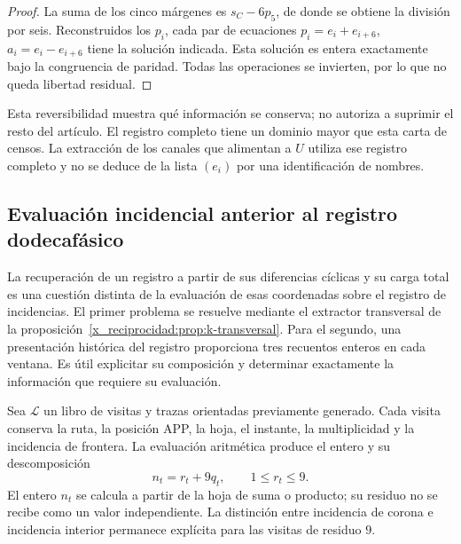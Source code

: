 \begin{proof}
La suma de los cinco márgenes es \(s_C-6p_5\), de donde se obtiene la
división por seis. Reconstruidos los \(p_i\), cada par de ecuaciones
\(p_i=e_i+e_{i+6}\), \(a_i=e_i-e_{i+6}\) tiene la solución indicada.
Esta solución es entera exactamente bajo la congruencia de paridad. Todas
las operaciones se invierten, por lo que no queda libertad residual.
\end{proof}

Esta reversibilidad muestra qué información se conserva; no autoriza a
suprimir el resto del artículo. El registro completo tiene un dominio mayor
que esta carta de censos. La extracción de los canales que alimentan a
\(U\) utiliza ese registro completo y no se deduce de la lista
\((e_i)\) por una identificación de nombres.


\subsection{Evaluación incidencial anterior al registro dodecafásico}
\label{x_reciprocidad:subsec:registro-evaluacion-incidencial}

La recuperación de un registro a partir de sus diferencias cíclicas y su
carga total es una cuestión distinta de la evaluación de esas coordenadas
sobre el registro de incidencias. El primer problema se resuelve mediante el
extractor transversal de la proposición~\ref{x_reciprocidad:prop:k-transversal}.
Para el segundo, una presentación histórica del
registro proporciona tres recuentos enteros en cada ventana. Es útil
explicitar su composición y determinar exactamente la información que
requiere su evaluación.

Sea \(\mathscr L\) un libro de visitas y trazas orientadas previamente
generado. Cada visita conserva la ruta, la posición APP, la hoja, el
instante, la multiplicidad y la incidencia de frontera. La evaluación
aritmética produce el entero y su descomposición
\[
 n_t=r_t+9q_t,\qquad 1\leq r_t\leq9.
\]
El entero \(n_t\) se calcula a partir de la hoja de suma o producto; su
residuo no se recibe como un valor independiente. La distinción entre
incidencia de corona e incidencia interior permanece explícita para las
visitas de residuo \(9\).


